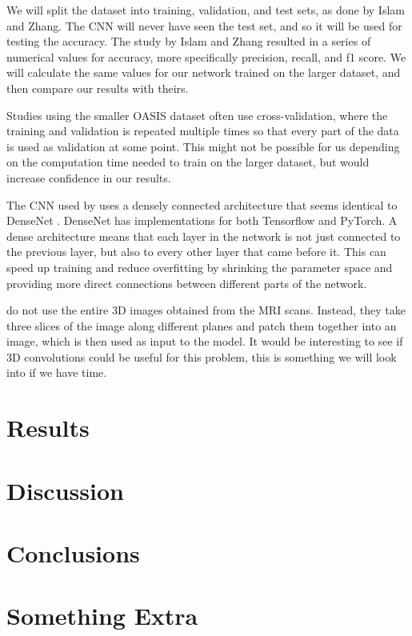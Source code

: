 \documentclass{kththesis}
\begin{document}
We will split the dataset into training, validation, and test sets, as done by Islam and Zhang. The CNN will never have seen the test set, and so it will be used for testing the accuracy. The study by Islam and Zhang resulted in a series of numerical values for accuracy, more specifically precision, recall, and f1 score. We will calculate the same values for our network trained on the larger dataset, and then compare our results with theirs. 

Studies using the smaller OASIS dataset often use cross-validation, where the training and validation is repeated multiple times so that every part of the data is used as validation at some point. This might not be possible for us depending on the computation time needed to train on the larger dataset, but would increase confidence in our results.

The CNN used by \textcite{islam2018early} uses a densely connected architecture that seems identical to DenseNet \parencite{huang2017densely}. DenseNet has implementations for both Tensorflow and PyTorch. A dense architecture means that each layer in the network is not just connected to the previous layer, but also to every other layer that came before it. This can speed up training and reduce overfitting by shrinking the parameter space and providing more direct connections between different parts of the network.

\textcite{islam2018early} do not use the entire 3D images obtained from the MRI scans. Instead, they take three slices of the image along different planes and patch them together into an image, which is then used as input to the model. It would be interesting to see if 3D convolutions could be useful for this problem, this is something we will look into if we have time.


\chapter{Results}

\chapter{Discussion}

\chapter{Conclusions}

\printbibliography[heading=bibintoc]

\appendix

\chapter{Something Extra}

\tailmatter
\end{document}

